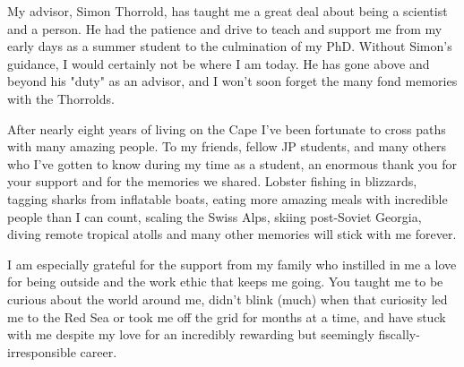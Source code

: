 {My advisor, Simon Thorrold, has taught me a great deal about being a scientist and a person. He had the patience and drive to teach and support me from my early days as a summer student to the culmination of my PhD. Without Simon's guidance, I would certainly not be where I am today. He has gone above and beyond his "duty" as an advisor, and I won't soon forget the many fond memories with the Thorrolds.

After nearly eight years of living on the Cape I've been fortunate to cross paths with many amazing people. To my friends, fellow JP students, and many others who I've gotten to know during my time as a student, an enormous thank you for your support and for the memories we shared. Lobster fishing in blizzards, tagging sharks from inflatable boats, eating more amazing meals with incredible people than I can count, scaling the Swiss Alps, skiing post-Soviet Georgia, diving remote tropical atolls and many other memories will stick with me forever.

I am especially grateful for the support from my family who instilled in me a love for being outside and the work ethic that keeps me going. You taught me to be curious about the world around me, didn't blink (much) when that curiosity led me to the Red Sea or took me off the grid for months at a time, and have stuck with me despite my love for an incredibly rewarding but seemingly fiscally-irresponsible career.


}
 


